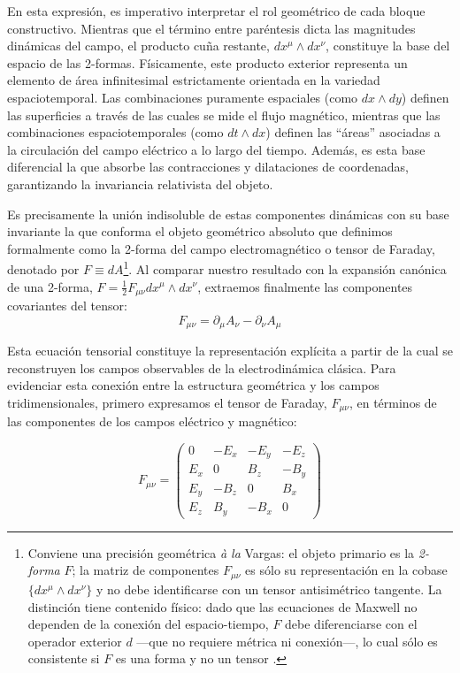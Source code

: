 En esta expresión, es imperativo interpretar el rol geométrico de cada bloque constructivo. Mientras que el término entre paréntesis dicta las magnitudes dinámicas del campo, el producto cuña restante, $dx^\mu \wedge dx^\nu$, constituye la base del espacio de las 2-formas. Físicamente, este producto exterior representa un elemento de área infinitesimal estrictamente orientada en la variedad espaciotemporal. Las combinaciones puramente espaciales (como $dx \wedge dy$) definen las superficies a través de las cuales se mide el flujo magnético, mientras que las combinaciones espaciotemporales (como $dt \wedge dx$) definen las ``áreas'' asociadas a la circulación del campo eléctrico a lo largo del tiempo. Además, es esta base diferencial la que absorbe las contracciones y dilataciones de coordenadas, garantizando la invariancia relativista del objeto.

Es precisamente la unión indisoluble de estas componentes dinámicas con su base invariante la que conforma el objeto geométrico absoluto que definimos formalmente como la 2-forma del campo electromagnético o tensor de Faraday, denotado por $F \equiv dA$\footnote{Conviene una precisión geométrica \emph{à la} Vargas: el objeto primario es la \emph{2-forma} $F$; la matriz de componentes $F_{\mu\nu}$ es sólo su representación en la cobase $\{dx^\mu\wedge dx^\nu\}$ y no debe identificarse con un tensor antisimétrico tangente. La distinción tiene contenido físico: dado que las ecuaciones de Maxwell no dependen de la conexión del espacio-tiempo, $F$ debe diferenciarse con el operador exterior $d$ ---que no requiere métrica ni conexión---, lo cual sólo es consistente si $F$ es una forma y no un tensor \parencite{vargas-2014, baez-muniain-1994, hehl-obukhov-2003}.}. Al comparar nuestro resultado con la expansión canónica de una 2-forma, $F = \frac{1}{2} F_{\mu\nu} dx^\mu \wedge dx^\nu$, extraemos finalmente las componentes covariantes del tensor:
\begin{equation}
    F_{\mu\nu} = \partial_\mu A_\nu - \partial_\nu A_\mu
\end{equation}

Esta ecuación tensorial constituye la representación explícita a partir de la cual se reconstruyen los campos observables de la electrodinámica clásica. Para evidenciar esta conexión entre la estructura geométrica y los campos tridimensionales, primero expresamos el tensor de Faraday, $F_{\mu\nu}$, en términos de las componentes de los campos eléctrico y magnético:

\begin{equation}
\label{eq:Faraday_Campos}
F_{\mu\nu} = 
\begin{pmatrix}
0 & -E_x & -E_y & -E_z \\
E_x & 0 & B_z & -B_y \\
E_y & -B_z & 0 & B_x \\
E_z & B_y & -B_x & 0
\end{pmatrix}
\end{equation}

